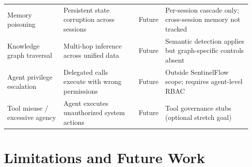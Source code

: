 \documentclass[12pt,a4paper]{article}
\begin{document}
\begin{table}[H]
\begin{tabular}{p{3.5cm}p{3.5cm}p{2.5cm}p{3.5cm}}
Memory poisoning & Persistent state corruption across sessions & \textcolor{red!60!black}{Future} & Per-session cascade only; cross-session memory not tracked \\
Knowledge graph traversal & Multi-hop inference across unified data & \textcolor{red!60!black}{Future} & Semantic detection applies but graph-specific controls absent \\
Agent privilege escalation & Delegated calls execute with wrong permissions & \textcolor{red!60!black}{Future} & Outside SentinelFlow scope; requires agent-level RBAC \\
Tool misuse / excessive agency & Agent executes unauthorized system actions & \textcolor{red!60!black}{Future} & Tool governance stubs (optional stretch goal) \\
\bottomrule
\end{tabular}
\end{table}


\section{Limitations and Future Work}
\label{sec:limitations}
\end{document}
